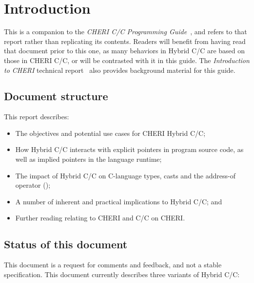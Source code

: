 \documentclass[12pt,twoside,openright,a4paper]{article}
\newcommand{\ccode}[1]{{\small\ttfamily{#1}}}
\newcommand*{\cpp}{\texorpdfstring{C\textsmaller[2]{\protect\nolinebreak[4]\hspace{-.05em}\raisebox{.45ex}{\textbf{++}}}}{C++}}
\newcommand*{\COrCpp}{C/\cpp{}}
\newcommand*{\purecapCOrCpp}{CHERI \COrCpp{}}
\newcommand*{\CHERIhybridCOrCpp}{CHERI Hybrid \COrCpp{}}
\newcommand*{\hybridCOrCpp}{Hybrid \COrCpp{}}
\begin{document}
\newpage
\setcounter{tocdepth}{2}
\tableofcontents

\newpage

\section{Introduction}

%
%
\abstracttext

This is a companion to the \textit{\purecapCOrCpp{} Programming
Guide}~\cite{UCAM-CL-TR-947}, and refers to that report rather than
replicating its contents.
Readers will benefit from having read that document prior to this one, as
many behaviors in \hybridCOrCpp{} are based on those in \purecapCOrCpp{}, or
will be contrasted with it in this guide.
The \textit{Introduction to CHERI} technical
report~\cite{UCAM-CL-TR-941} also provides background material for this
guide.

\subsection{Document structure}

This report describes:

\begin{itemize}
\item The objectives and potential use cases for \CHERIhybridCOrCpp{};
\item How \hybridCOrCpp{} interacts with explicit pointers in program source
  code, as well as implied pointers in the language runtime;
\item The impact of \hybridCOrCpp{} on C-language types, casts and the address-of operator
  (\ccode{\&});
\item A number of inherent and practical implications to \hybridCOrCpp{}; and
\item Further reading relating to CHERI and \COrCpp{} on CHERI.
\end{itemize}

\subsection{Status of this document}

This document is a request for comments and feedback, and not a stable
specification.
This document currently describes three variants of \hybridCOrCpp{}:
\end{document}
